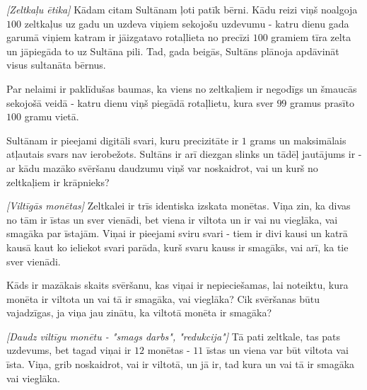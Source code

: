 




\noindent 

\begin{problem}
\textit{[Zeltkaļu ētika]}
Kādam citam Sultānam ļoti patīk bērni. Kādu reizi viņš noalgoja $100$ zeltkaļus uz gadu un uzdeva viņiem sekojošu uzdevumu - katru dienu gada garumā viņiem katram ir jāizgatavo rotaļlieta no precīzi $100$ gramiem tīra zelta un jāpiegāda to uz Sultāna pili. Tad, gada beigās, Sultāns plānoja apdāvināt visus sultanāta bērnus. 

Par nelaimi ir paklīdušas baumas, ka viens no zeltkaļiem ir negodīgs un šmaucās sekojošā veidā - katru dienu viņš piegādā rotaļlietu, kura sver $99$ gramus prasīto $100$ gramu vietā.

Sultānam ir pieejami digitāli svari, kuru precizitāte ir $1$ grams un maksimālais atļautais svars nav ierobežots. Sultāns ir arī diezgan slinks un tādēļ jautājums ir - ar kādu mazāko svēršanu daudzumu viņš var noskaidrot, vai un kurš no zeltkaļiem ir krāpnieks?
\end{problem}
%

\begin{problem}
\textit{[Viltīgās monētas]}
Zeltkalei ir trīs identiska izskata monētas. Viņa zin, ka divas no tām ir īstas un sver vienādi, bet viena ir viltota un ir vai nu vieglāka, vai smagāka par īstajām. 
Viņai ir pieejami sviru svari - tiem ir divi kausi un katrā kausā kaut ko ieliekot svari parāda, kurš svaru kauss ir smagāks, vai arī, ka tie sver vienādi.

Kāds ir mazākais skaits svēršanu, kas viņai ir nepieciešamas, lai noteiktu, kura monēta ir viltota un vai tā ir smagāka, vai vieglāka? Cik svēršanas būtu vajadzīgas, ja viņa jau zinātu, ka viltotā monēta ir smagāka?

\end{problem}
%

\begin{problem}
\textit{[Daudz viltīgu monētu - "smags darbs", "redukcija"]}
Tā pati zeltkale, tas pats uzdevums, bet tagad viņai ir $12$ monētas - $11$ īstas un viena var būt viltota vai īsta. Viņa, grib noskaidrot, vai ir viltotā, un jā ir, tad kura un vai tā ir smagāka vai vieglāka. 
\end{problem}
%


